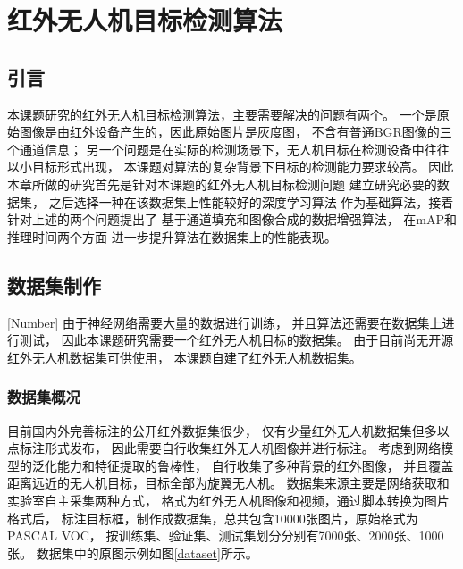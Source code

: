 
\chapter{红外无人机目标检测算法}

\section{引言}
本课题研究的红外无人机目标检测算法，主要需要解决的问题有两个。
一个是原始图像是由红外设备产生的，因此原始图片是灰度图，
不含有普通BGR图像的三个通道信息；
另一个问题是在实际的检测场景下，无人机目标在检测设备中往往以小目标形式出现，
本课题对算法的复杂背景下目标的检测能力要求较高。
因此本章所做的研究首先是针对本课题的红外无人机目标检测问题
建立研究必要的数据集，
之后选择一种在该数据集上性能较好的深度学习算法
作为基础算法，接着针对上述的两个问题提出了
基于通道填充和图像合成的数据增强算法，
在mAP和推理时间两个方面
进一步提升算法在数据集上的性能表现。

\section{数据集制作}[Number]
由于神经网络需要大量的数据进行训练，
并且算法还需要在数据集上进行测试，
因此本课题研究需要一个红外无人机目标的数据集。
由于目前尚无开源红外无人机数据集可供使用，
本课题自建了红外无人机数据集。

\subsection{数据集概况}
目前国内外完善标注的公开红外数据集很少，
仅有少量红外无人机数据集但多以点标注形式发布，
因此需要自行收集红外无人机图像并进行标注。
考虑到网络模型的泛化能力和特征提取的鲁棒性，
自行收集了多种背景的红外图像，
并且覆盖距离远近的无人机目标，目标全部为旋翼无人机。
数据集来源主要是网络获取和实验室自主采集两种方式，
格式为红外无人机图像和视频，通过脚本转换为图片格式后，
标注目标框，制作成数据集，总共包含10000张图片，原始格式为PASCAL VOC，
按训练集、验证集、测试集划分分别有7000张、2000张、1000张。
数据集中的原图示例如图\ref{dataset}所示。

